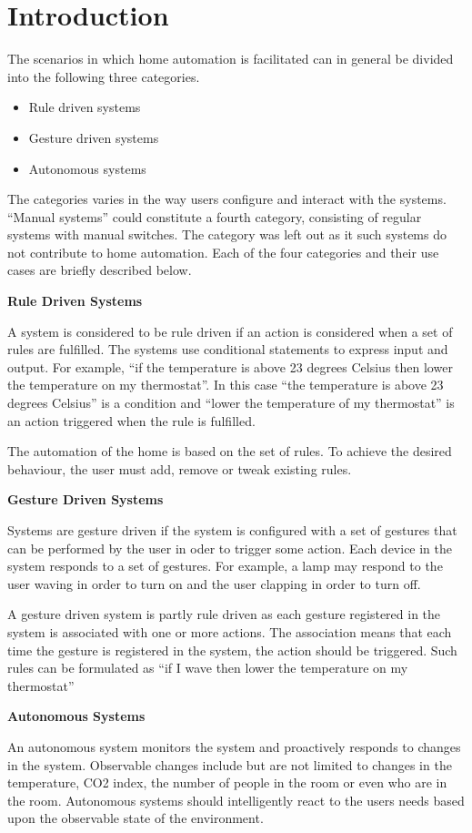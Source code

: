 \chapter{Introduction}\label{chap:introduction}

The scenarios in which home automation is facilitated can in general be divided into the following three categories.

\begin{itemize}
\item Rule driven systems
\item Gesture driven systems
\item Autonomous systems
\end{itemize}

The categories varies in the way users configure and interact with the systems. ``Manual systems'' could constitute a fourth category, consisting of regular systems with manual switches. The category was left out as it such systems do not contribute to home automation.
Each of the four categories and their use cases are briefly described below.

\textbf{Rule Driven Systems}

A system is considered to be rule driven if an action is considered when a set of rules are fulfilled. The systems use conditional statements to express input and output. For example, ``if the temperature is above 23 degrees Celsius then lower the temperature on my thermostat''. In this case ``the temperature is above 23 degrees Celsius'' is a condition and ``lower the temperature of my thermostat'' is an action triggered when the rule is fulfilled.

The automation of the home is based on the set of rules. To achieve the desired behaviour, the user must add, remove or tweak existing rules.

\textbf{Gesture Driven Systems}

Systems are gesture driven if the system is configured with a set of gestures that can be performed by the user in oder to trigger some action. Each device in the system responds to a set of gestures. For example, a lamp may respond to the user waving in order to turn on and the user clapping in order to turn off.

A gesture driven system is partly rule driven as each gesture registered in the system is associated with one or more actions. The association means that each time the gesture is registered in the system, the action should be triggered. Such rules can be formulated as ``if I wave then lower the temperature on my thermostat''

\textbf{Autonomous Systems}

An autonomous system monitors the system and proactively responds to changes in the system. Observable changes include but are not limited to changes in the temperature, CO2 index, the number of people in the room or even who are in the room.
Autonomous systems should intelligently react to the users needs based upon the observable state of the environment.

